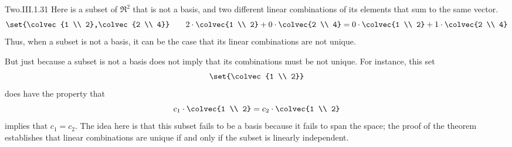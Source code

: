 \begin{ans}{Two.III.1.31}
      Here is a subset of $\Re^2$ that is not a basis, and two different
      linear combinations of its elements that sum to the same vector.
      \begin{equation*}
        \set{\colvec{1 \\ 2},\colvec{2 \\ 4}}
        \qquad
        2\cdot\colvec{1 \\ 2}+0\cdot\colvec{2 \\ 4}
        =0\cdot\colvec{1 \\ 2}+1\cdot\colvec{2 \\ 4}
      \end{equation*}
      Thus, when a subset is not a basis, it can be the case that its
      linear combinations are not unique.

      But just because a subset is not a basis does not imply that its
      combinations must be not unique.
      For instance, this set
      \begin{equation*}
        \set{\colvec{1 \\ 2}}
      \end{equation*}
      does have the property that
      \begin{equation*}
        c_1\cdot\colvec{1 \\ 2}
        =
        c_2\cdot\colvec{1 \\ 2}
      \end{equation*}
      implies that $c_1=c_2$.
      The idea here is that this subset fails to be a basis because it fails
      to span the space; the proof of the theorem establishes that
      linear combinations are unique if and only if the subset is linearly
      independent.
     
\end{ans}
